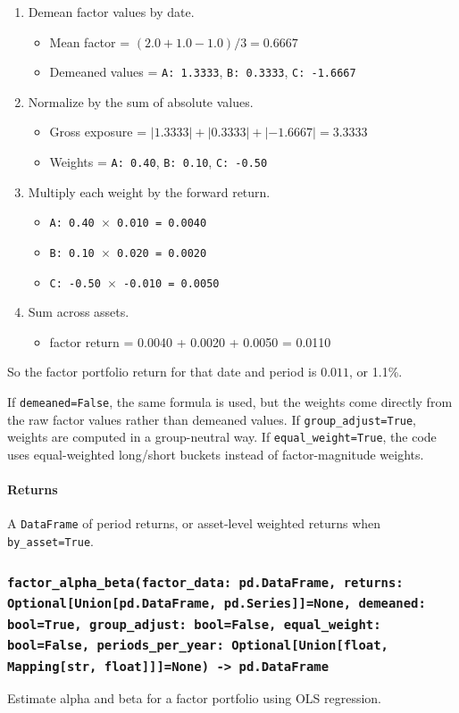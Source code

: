 \documentclass[11pt]{article}
\begin{document}
\begin{enumerate}
  \item Demean factor values by date.
  \begin{itemize}
    \item Mean factor = \((2.0 + 1.0 - 1.0) / 3 = 0.6667\)
    \item Demeaned values = \texttt{A: 1.3333}, \texttt{B: 0.3333}, \texttt{C: -1.6667}
  \end{itemize}
  \item Normalize by the sum of absolute values.
  \begin{itemize}
    \item Gross exposure = \(|1.3333| + |0.3333| + |-1.6667| = 3.3333\)
    \item Weights = \texttt{A: 0.40}, \texttt{B: 0.10}, \texttt{C: -0.50}
  \end{itemize}
  \item Multiply each weight by the forward return.
  \begin{itemize}
    \item \texttt{A: 0.40 \(\times\) 0.010 = 0.0040}
    \item \texttt{B: 0.10 \(\times\) 0.020 = 0.0020}
    \item \texttt{C: -0.50 \(\times\) -0.010 = 0.0050}
  \end{itemize}
  \item Sum across assets.
  \begin{itemize}
    \item factor return = 0.0040 + 0.0020 + 0.0050 = 0.0110
  \end{itemize}
\end{enumerate}

So the factor portfolio return for that date and period is \(0.011\), or 1.1\%.

If \texttt{demeaned=False}, the same formula is used, but the weights come directly from the raw factor values rather than demeaned values. If \texttt{group\_adjust=True}, weights are computed in a group-neutral way. If \texttt{equal\_weight=True}, the code uses equal-weighted long/short buckets instead of factor-magnitude weights.

\paragraph{Returns}
A \texttt{DataFrame} of period returns, or asset-level weighted returns when \texttt{by\_asset=True}.

\subsubsection{\texttt{factor\_alpha\_beta(factor\_data: pd.DataFrame, returns: Optional[Union[pd.DataFrame, pd.Series]]=None, demeaned: bool=True, group\_adjust: bool=False, equal\_weight: bool=False, periods\_per\_year: Optional[Union[float, Mapping[str, float]]]=None) -> pd.DataFrame}}
Estimate alpha and beta for a factor portfolio using OLS regression.
\end{document}
